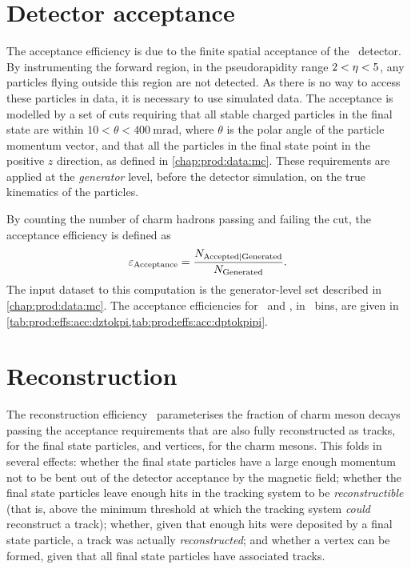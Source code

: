 \section{Detector acceptance}
\label{chap:prod:effs:acc}

The acceptance efficiency is due to the finite spatial acceptance of the \lhcb\ 
detector.
By instrumenting the forward region, in the pseudorapidity range $2 < \eta < 
5$, any particles flying outside this region are not detected.
As there is no way to access these particles in data, it is necessary to use 
simulated data.
The acceptance is modelled by a set of cuts requiring that all stable charged 
particles in the final state are within $10 < \theta < 
\SI{400}{\milli\radian}$, where $\theta$ is the polar angle of the particle 
momentum vector, and that all the particles in the final state point in the 
positive $z$ direction, as defined in \cref{chap:prod:data:mc}.
These requirements are applied at the \emph{generator} level, before the 
detector simulation, on the true kinematics of the particles.

By counting the number of charm hadrons passing and failing the cut, the 
acceptance efficiency is defined as
\begin{equation}
  \effacc = \frac{%
    N_{\text{Accepted}|\text{Generated}}
  }
  {%
    N_{\text{\text{Generated}}}
  }.
  \label{eqn:prod:effs:acc}
\end{equation}
The input dataset to this computation is the generator-level set described in 
\cref{chap:prod:data:mc}.
The acceptance efficiencies for \DzToKpi\ and \DpToKpipi, in \pTy\ bins, are 
given in \cref{tab:prod:effs:acc:dztokpi,tab:prod:effs:acc:dptokpipi}.

\section{Reconstruction}
\label{chap:prod:effs:reco}

The reconstruction efficiency \effreco\ parameterises the fraction of charm meson decays passing the acceptance requirements that are also fully reconstructed as tracks, for the final state particles, and vertices, for the charm mesons.
This folds in several effects: whether the final state particles have a large enough momentum not to be bent out of the detector acceptance by the magnetic field; whether the final state particles leave enough hits in the tracking system to be \emph{reconstructible} (that is, above the minimum threshold at which the tracking system \emph{could} reconstruct a track); whether, given that enough hits were deposited by a final state particle, a track was actually \emph{reconstructed}; and whether a vertex can be formed, given that all final state particles have associated tracks.

